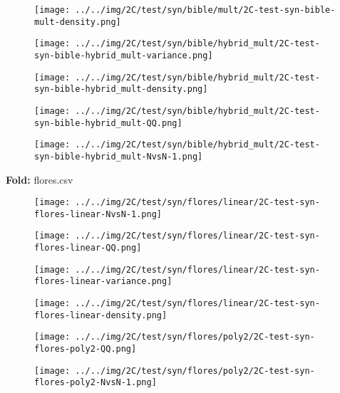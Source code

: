 \begin{figure}[H]
\centering	\texttt{[image: ../../img/2C/test/syn/bible/mult/2C-test-syn-bible-mult-density.png]}
\end{figure}
\begin{figure}[H]
\centering	\texttt{[image: ../../img/2C/test/syn/bible/hybrid\_mult/2C-test-syn-bible-hybrid\_mult-variance.png]}
\end{figure}
\begin{figure}[H]
\centering	\texttt{[image: ../../img/2C/test/syn/bible/hybrid\_mult/2C-test-syn-bible-hybrid\_mult-density.png]}
\end{figure}
\begin{figure}[H]
\centering	\texttt{[image: ../../img/2C/test/syn/bible/hybrid\_mult/2C-test-syn-bible-hybrid\_mult-QQ.png]}
\end{figure}
\begin{figure}[H]
\centering	\texttt{[image: ../../img/2C/test/syn/bible/hybrid\_mult/2C-test-syn-bible-hybrid\_mult-NvsN-1.png]}
\end{figure}
\textbf{Fold:} flores.csv
\begin{figure}[H]
\centering	\texttt{[image: ../../img/2C/test/syn/flores/linear/2C-test-syn-flores-linear-NvsN-1.png]}
\end{figure}
\begin{figure}[H]
\centering	\texttt{[image: ../../img/2C/test/syn/flores/linear/2C-test-syn-flores-linear-QQ.png]}
\end{figure}
\begin{figure}[H]
\centering	\texttt{[image: ../../img/2C/test/syn/flores/linear/2C-test-syn-flores-linear-variance.png]}
\end{figure}
\begin{figure}[H]
\centering	\texttt{[image: ../../img/2C/test/syn/flores/linear/2C-test-syn-flores-linear-density.png]}
\end{figure}
\begin{figure}[H]
\centering	\texttt{[image: ../../img/2C/test/syn/flores/poly2/2C-test-syn-flores-poly2-QQ.png]}
\end{figure}
\begin{figure}[H]
\centering	\texttt{[image: ../../img/2C/test/syn/flores/poly2/2C-test-syn-flores-poly2-NvsN-1.png]}
\end{figure}
